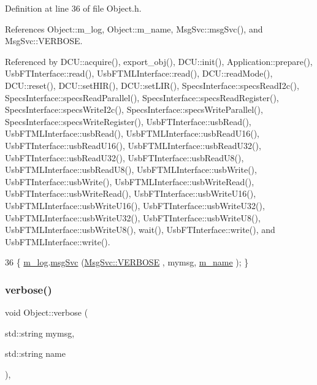Definition at line 36 of file Object.\+h.



References Object\+::m\+\_\+log, Object\+::m\+\_\+name, Msg\+Svc\+::msg\+Svc(), and Msg\+Svc\+::\+V\+E\+R\+B\+O\+SE.



Referenced by D\+C\+U\+::acquire(), export\+\_\+obj(), D\+C\+U\+::init(), Application\+::prepare(), Usb\+F\+T\+Interface\+::read(), Usb\+F\+T\+M\+L\+Interface\+::read(), D\+C\+U\+::read\+Mode(), D\+C\+U\+::reset(), D\+C\+U\+::set\+H\+I\+R(), D\+C\+U\+::set\+L\+I\+R(), Specs\+Interface\+::specs\+Read\+I2c(), Specs\+Interface\+::specs\+Read\+Parallel(), Specs\+Interface\+::specs\+Read\+Register(), Specs\+Interface\+::specs\+Write\+I2c(), Specs\+Interface\+::specs\+Write\+Parallel(), Specs\+Interface\+::specs\+Write\+Register(), Usb\+F\+T\+Interface\+::usb\+Read(), Usb\+F\+T\+M\+L\+Interface\+::usb\+Read(), Usb\+F\+T\+M\+L\+Interface\+::usb\+Read\+U16(), Usb\+F\+T\+Interface\+::usb\+Read\+U16(), Usb\+F\+T\+M\+L\+Interface\+::usb\+Read\+U32(), Usb\+F\+T\+Interface\+::usb\+Read\+U32(), Usb\+F\+T\+Interface\+::usb\+Read\+U8(), Usb\+F\+T\+M\+L\+Interface\+::usb\+Read\+U8(), Usb\+F\+T\+M\+L\+Interface\+::usb\+Write(), Usb\+F\+T\+Interface\+::usb\+Write(), Usb\+F\+T\+M\+L\+Interface\+::usb\+Write\+Read(), Usb\+F\+T\+Interface\+::usb\+Write\+Read(), Usb\+F\+T\+Interface\+::usb\+Write\+U16(), Usb\+F\+T\+M\+L\+Interface\+::usb\+Write\+U16(), Usb\+F\+T\+Interface\+::usb\+Write\+U32(), Usb\+F\+T\+M\+L\+Interface\+::usb\+Write\+U32(), Usb\+F\+T\+Interface\+::usb\+Write\+U8(), Usb\+F\+T\+M\+L\+Interface\+::usb\+Write\+U8(), wait(), Usb\+F\+T\+Interface\+::write(), and Usb\+F\+T\+M\+L\+Interface\+::write().


\begin{DoxyCode}
36 \{ \hyperlink{classObject_a0d269813dd7ac1f24bc143031e2963f2}{m\_log}.\hyperlink{classMsgSvc_ad25f18047920cc59a314e5098259711c}{msgSvc} (\hyperlink{classMsgSvc_ae671eb7301996cd049d2da8a65925926af655256b06494ade5ba830abe5401ec9}{MsgSvc::VERBOSE} , mymsg, \hyperlink{classObject_a8b83c95c705d2c3ba0d081fe1710f48d}{m\_name} ); \}
\end{DoxyCode}
\mbox{\label{classObject_a2d4120195317e2a3c6532e8bb9f3da68}} 
\subsubsection{\texorpdfstring{verbose()}{verbose()}\hspace{0.1cm}{\footnotesize\ttfamily [2/2]}}
{\footnotesize\ttfamily void Object\+::verbose (\begin{DoxyParamCaption}\item[{std\+::string}]{mymsg,  }\item[{std\+::string}]{name }\end{DoxyParamCaption})\hspace{0.3cm}{\ttfamily [inline]}, {\ttfamily [inherited]}}



